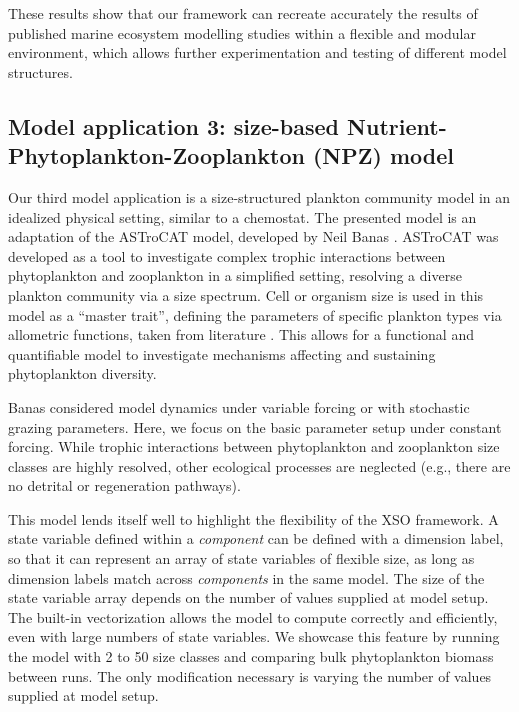 \documentclass[gmd, manuscript]{copernicus}
\begin{document}
These results show that our framework can recreate accurately the results of published marine ecosystem modelling studies within a flexible and modular environment, which allows further experimentation and testing of different model structures.


\subsection{Model application 3: size-based Nutrient-Phytoplankton-Zooplankton (NPZ) model}

Our third model application is a size-structured plankton community model in an idealized physical setting, similar to a chemostat. The presented model is an adaptation of the ASTroCAT model, developed by Neil Banas \citep{Banas2011b}. ASTroCAT was developed as a tool to investigate complex trophic interactions between phytoplankton and zooplankton in a simplified setting, resolving a diverse plankton community via a size spectrum. Cell or organism size is used in this model as a “master trait”, defining the parameters of specific plankton types via allometric functions, taken from literature \citep{Litchman2008}. This allows for a functional and quantifiable model to investigate mechanisms affecting and sustaining phytoplankton diversity.

Banas considered model dynamics under variable forcing or with stochastic grazing parameters. Here, we focus on the basic parameter setup under constant forcing. While trophic interactions between phytoplankton and zooplankton size classes are highly resolved, other ecological processes are neglected (e.g., there are no detrital or regeneration pathways).  

This model lends itself well to highlight the flexibility of the XSO framework. A state variable defined within a \textit{component} can be defined with a dimension label, so that it can represent an array of state variables of flexible size, as long as dimension labels match across \textit{components} in the same model. The size of the state variable array depends on the number of values supplied at model setup. The built-in vectorization allows the model to compute correctly and efficiently, even with large numbers of state variables. We showcase this feature by running the model with 2 to 50 size classes and comparing bulk phytoplankton biomass between runs. The only modification necessary is varying the number of values supplied at model setup.
\end{document}
